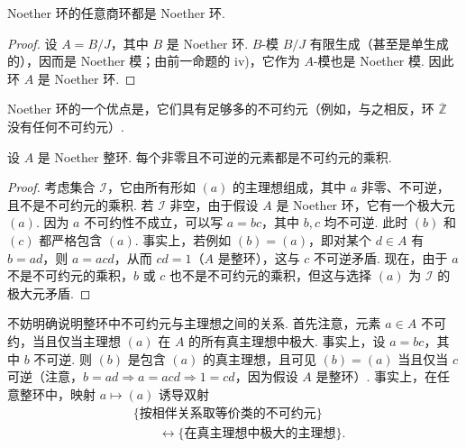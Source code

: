 \begin{corollary*}
Noether 环的任意商环都是 Noether 环.
\end{corollary*}
\begin{proof}
设 $A=B/J$，其中 $B$ 是 Noether 环. $B$-模 $B/J$ 有限生成（甚至是单生成的），因而是 Noether 模；由前一命题的 iv)，它作为 $A$-模也是 Noether 模. 因此环 $A$ 是 Noether 环.
\end{proof}
Noether 环的一个优点是，它们具有足够多的不可约元（例如，与之相反，环 $\overline{\mathbb Z}$ 没有任何不可约元）.
\begin{theorem*}
设 $A$ 是 Noether 整环. 每个非零且不可逆的元素都是不可约元的乘积.
\end{theorem*}
\begin{proof}
考虑集合 $\mathcal I$，它由所有形如 $(a)$ 的主理想组成，其中 $a$ 非零、不可逆，且不是不可约元的乘积. 若 $\mathcal I$ 非空，由于假设 $A$ 是 Noether 环，它有一个极大元 $(a)$. 因为 $a$ 不可约性不成立，可以写 $a=bc$，其中 $b,c$ 均不可逆. 此时 $(b)$ 和 $(c)$ 都严格包含 $(a)$. 事实上，若例如 $(b)=(a)$，即对某个 $d\in A$ 有 $b=ad$，则 $a=acd$，从而 $cd=1$（$A$ 是整环），这与 $c$ 不可逆矛盾. 现在，由于 $a$ 不是不可约元的乘积，$b$ 或 $c$ 也不是不可约元的乘积，但这与选择 $(a)$ 为 $\mathcal I$ 的极大元矛盾.
\end{proof}
\begin{remark*}
不妨明确说明整环中不可约元与主理想之间的关系. 首先注意，元素 $a\in A$ 不可约，当且仅当主理想 $(a)$ 在 $A$ 的所有真主理想中极大. 事实上，设 $a=bc$，其中 $b$ 不可逆. 则 $(b)$ 是包含 $(a)$ 的真主理想，且可见 $(b)=(a)$ 当且仅当 $c$ 可逆（注意，$b=ad\Rightarrow a=acd\Rightarrow1=cd$，因为假设 $A$ 是整环）. 事实上，在任意整环中，映射 $a\mapsto(a)$ 诱导双射
\begin{align*}
&\{\text{按相伴关系取等价类的不可约元}\}\\
&\qquad\longleftrightarrow\{\text{在真主理想中极大的主理想}\}.
\end{align*}
\end{remark*}

